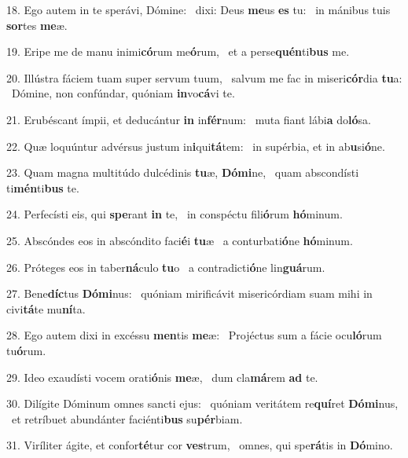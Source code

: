 18. Ego autem in te sperávi, Dómine: \dag\  dixi: Deus \textbf{me}us \textbf{es} tu: \ast\  in mánibus tuis \textbf{sor}tes \textbf{me}æ.\

19. Eripe me de manu inimi\textbf{có}rum me\textbf{ó}rum, \ast\  et a perse\textbf{quén}ti\textbf{bus} me.\

20. Illústra fáciem tuam super servum tuum, \dag\  salvum me fac in miseri\textbf{cór}dia \textbf{tu}a: \ast\  Dómine, non confúndar, quóniam \textbf{in}vo\textbf{cá}vi te.\

21. Erubéscant ímpii, et deducántur \textbf{in} in\textbf{fér}num: \ast\  muta fiant lábi\textbf{a} do\textbf{ló}sa.\

22. Quæ loquúntur advérsus justum in\textbf{i}qui\textbf{tá}tem: \ast\  in supérbia, et in ab\textbf{u}si\textbf{ó}ne.\

23. Quam magna multitúdo dulcédinis \textbf{tu}æ, \textbf{Dó}\textbf{mi}ne, \ast\  quam abscondísti ti\textbf{mén}ti\textbf{bus} te.\

24. Perfecísti eis, qui \textbf{spe}rant \textbf{in} te, \ast\  in conspéctu fili\textbf{ó}rum \textbf{hó}minum.\

25. Abscóndes eos in abscóndito faci\textbf{é}i \textbf{tu}æ \ast\  a conturbati\textbf{ó}ne \textbf{hó}minum.\

26. Próteges eos in taber\textbf{ná}culo \textbf{tu}o \ast\  a contradicti\textbf{ó}ne lin\textbf{guá}rum.\

27. Bene\textbf{díc}tus \textbf{Dó}\textbf{mi}nus: \ast\  quóniam mirificávit misericórdiam suam mihi in civi\textbf{tá}te mu\textbf{ní}ta.\

28. Ego autem dixi in excéssu \textbf{men}tis \textbf{me}æ: \ast\  Projéctus sum a fácie ocu\textbf{ló}rum tu\textbf{ó}rum.\

29. Ideo exaudísti vocem orati\textbf{ó}nis \textbf{me}æ, \ast\  dum cla\textbf{má}rem \textbf{ad} te.\

30. Dilígite Dóminum omnes sancti ejus: \dag\  quóniam veritátem re\textbf{quí}ret \textbf{Dó}\textbf{mi}nus, \ast\  et retríbuet abundánter faciénti\textbf{bus} su\textbf{pér}biam.\

31. Viríliter ágite, et confor\textbf{té}tur cor \textbf{ves}trum, \ast\  omnes, qui spe\textbf{rá}tis in \textbf{Dó}mino.\

